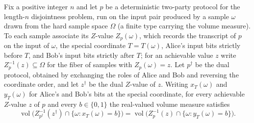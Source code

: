 \begin{theorem}
\label{CommunicationComplexity.Functions.Disjointness.RandomizedLowerBound.volume_measureReal_zVariable_dualProtocol_dualZValue_inter_specialX}
\leanok
{}
Fix a positive integer $n$ and let $p$ be a deterministic two-party protocol for the
length-$n$ disjointness problem, run on the input pair produced by a sample $\omega$
drawn from the hard sample space $\Omega$ (a finite type carrying the volume measure).
To each sample associate its $Z$-value $Z_p(\omega)$, which records the transcript of
$p$ on the input of $\omega$, the special coordinate $T = T(\omega)$, Alice's input bits
strictly before $T$, and Bob's input bits strictly after $T$; for an achievable value
$z$ write $Z_p^{-1}(z) \subseteq \Omega$ for the fiber of samples with $Z_p(\omega) =
z$. Let $p^{\dagger}$ be the dual protocol, obtained by exchanging the roles of Alice
and Bob and reversing the coordinate order, and let $z^{\dagger}$ be the dual $Z$-value
of $z$. Writing $x_T(\omega)$ and $y_T(\omega)$ for Alice's and Bob's bits at the
special coordinate, for every achievable $Z$-value $z$ of $p$ and every $b \in \{0,1\}$
the real-valued volume measure satisfies
\[
\operatorname{vol}\!\big(Z_{p^{\dagger}}^{-1}(z^{\dagger}) \cap \{\omega : x_T(\omega) =
b\}\big)
= \operatorname{vol}\!\big(Z_p^{-1}(z) \cap \{\omega : y_T(\omega) = b\}\big).
\]
\end{theorem}

